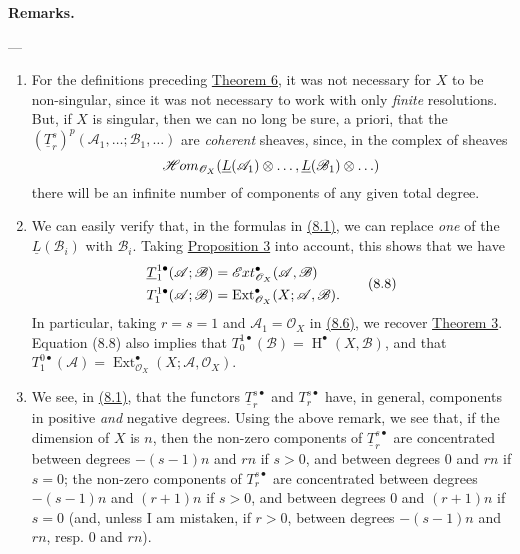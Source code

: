 \documentclass{article}
\newenvironment{rmenv}[1]
  {\phantomsection\par\smallskip\noindent\textbf{#1.}\rmfamily}
  {\par\smallskip}
\newcommand{\oldpage}[1]{\marginpar{\footnotesize$\Big\vert$ \textit{p.~#1}}}
\theoremstyle{definition}
\theoremstyle{definition}
\theoremstyle{definition}
\theoremstyle{definition}
\theoremstyle{remark}
\begin{document}
\begin{rmenv}{Remarks}

\oldpage{149-24}---

\begin{enumerate}
\def\labelenumi{\arabic{enumi}.}
\item
  For the definitions preceding \protect\hyperlink{fga-1-theorem-6}{Theorem 6}, it was not necessary for \(X\) to be non-singular, since it was not necessary to work with only \emph{finite} resolutions.
  But, if \(X\) is singular, then we can no long be sure, a priori, that the \((\underline{T}_r^s)^p({\mathscr{A}}_1,\ldots;{\mathscr{B}}_1,\ldots)\) are \emph{coherent} sheaves, since, in the complex of sheaves
  \[
   \mathscr{H}\kern -.5pt om_{{\mathscr{O}}_X}(\underline{L}({\mathscr{A}}_1)\otimes\ldots,\underline{L}({\mathscr{B}}_1)\otimes\ldots)
    \]
  there will be an infinite number of components of any given total degree.
\item
  We can easily verify that, in the formulas in \protect\hyperlink{fga-1-equation-8.1}{(8.1)}, we can replace \emph{one} of the \(\underline{L}({\mathscr{B}}_i)\) with \({\mathscr{B}}_i\).
  Taking \protect\hyperlink{fga-1-proposition-3}{Proposition 3} into account, this shows that we have
  \[
   \begin{aligned}
     \underline{T}_1^{1\bullet}({\mathscr{A}};{\mathscr{B}})
     &= \mathscr{E}\kern -.5pt xt_{{\mathscr{O}}_X}^\bullet({\mathscr{A}},{\mathscr{B}})
   \\T_1^{1\bullet}({\mathscr{A}};{\mathscr{B}})
     &= \operatorname{Ext}_{{\mathscr{O}}_X}^\bullet(X;{\mathscr{A}},{\mathscr{B}}).
   \end{aligned}
    \tag{8.8}
    \]
  In particular, taking \(r=s=1\) and \({\mathscr{A}}_1={\mathscr{O}}_X\) in \protect\hyperlink{fga-1-equation-8.6}{(8.6)}, we recover \protect\hyperlink{fga-1-theorem-3}{Theorem 3}.
  Equation (8.8) also implies that \(T_0^{1\bullet}({\mathscr{B}})=\operatorname{H}^\bullet(X,{\mathscr{B}})\), and that \(T_1^{0\bullet}({\mathscr{A}})=\operatorname{Ext}_{{\mathscr{O}}_X}^\bullet(X;{\mathscr{A}},{\mathscr{O}}_X)\).
\item
  We see, in \protect\hyperlink{fga-1-equation-8.1}{(8.1)}, that the functors \(\underline{T}_r^{s\bullet}\) and \(T_r^{s\bullet}\) have, in general, components in positive \emph{and} negative degrees.
  Using the above remark, we see that, if the dimension of \(X\) is \(n\), then the non-zero components of \(\underline{T}_r^{s\bullet}\) are concentrated between degrees \(-(s-1)n\) and \(rn\) if \(s>0\), and between degrees \(0\) and \(rn\) if \(s=0\); the non-zero components of \(T_r^{s\bullet}\) are concentrated between degrees \(-(s-1)n\) and \((r+1)n\) if \(s>0\), and between degrees \(0\) and \((r+1)n\) if \(s=0\) (and, unless I am mistaken, if \(r>0\), between degrees \(-(s-1)n\) and \(rn\), resp. \(0\) and \(rn\)).
\end{enumerate}

\end{rmenv}
\end{document}
